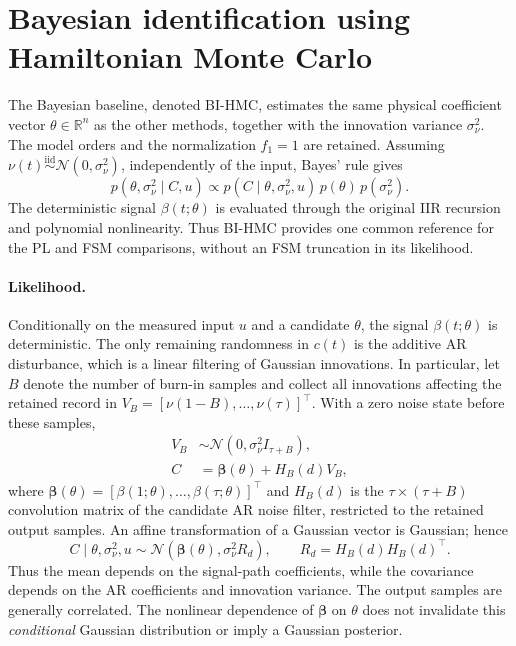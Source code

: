 \documentclass[11pt]{article}
\begin{document}
  \appendix
\fi

\section{Bayesian identification using Hamiltonian Monte Carlo}
\label{app:bi_hmc}

The Bayesian baseline, denoted BI-HMC, estimates the same physical
coefficient vector $\theta\in\mathbb R^n$ as the other methods, together
with the innovation variance $\sigma_\nu^2$. The model orders and the
normalization $f_1=1$ are retained. Assuming
$\nu(t)\overset{\mathrm{iid}}{\sim}\mathcal N(0,\sigma_\nu^2)$,
independently of the input, Bayes' rule gives
\begin{equation}
\label{eq:bi_posterior}
 p(\theta,\sigma_\nu^2\mid C,u)
 \propto p(C\mid\theta,\sigma_\nu^2,u)\,
          p(\theta)\,p(\sigma_\nu^2).
\end{equation}
The deterministic signal $\beta(t;\theta)$ is evaluated through the
original IIR recursion and polynomial nonlinearity. Thus BI-HMC provides
one common reference for the PL and FSM comparisons, without an FSM
truncation in its likelihood.

\paragraph{Likelihood.}
Conditionally on the measured input $u$ and a candidate $\theta$, the
signal $\beta(t;\theta)$ is deterministic. The only remaining randomness
in $c(t)$ is the additive AR disturbance, which is a linear filtering of
Gaussian innovations. In particular, let $B$ denote the number of burn-in
samples and collect all innovations affecting the retained record in
$V_B=[\nu(1-B),\ldots,\nu(\tau)]^\top$. With a zero noise state before
these samples,
\begin{equation}
\label{eq:bi_gaussian_construction}
 \begin{aligned}
 V_B&\sim\mathcal N(0,\sigma_\nu^2 I_{\tau+B}),\\
 C&=\boldsymbol\beta(\theta)+H_B(d)V_B,
 \end{aligned}
\end{equation}
where $\boldsymbol\beta(\theta)=[\beta(1;\theta),\ldots,
\beta(\tau;\theta)]^\top$ and $H_B(d)$ is the
$\tau\times(\tau+B)$ convolution matrix of the candidate AR noise
filter, restricted to the retained output samples. An affine
transformation of a Gaussian vector is Gaussian; hence
\begin{equation}
\label{eq:bi_gaussian_data}
 C\mid\theta,\sigma_\nu^2,u
 \sim\mathcal N\!\left(\boldsymbol\beta(\theta),
                      \sigma_\nu^2 R_d\right),
 \qquad R_d=H_B(d)H_B(d)^\top.
\end{equation}
Thus the mean depends on the signal-path coefficients, while the
covariance depends on the AR coefficients and innovation variance.
The output samples are generally correlated. The nonlinear dependence
of $\boldsymbol\beta$ on $\theta$ does not invalidate this
\emph{conditional} Gaussian distribution or imply a Gaussian posterior.
\end{document}

